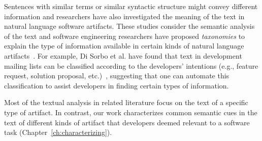 Sentences with similar terms or similar syntactic structure might convey different information
and researchers have also investigated the meaning of the text in natural language software artifacts. 
These studies consider the semantic analysis of the text and 
software engineering researchers have proposed \textit{taxonomies} to explain the type of information 
available in certain kinds of natural language artifacts~\cite{Maalej2013, Arya2019}. 
For example, Di Sorbo et al. have found that 
text in development mailing lists can be classified according to the developers' intentions (e.g., feature request, solution proposal, etc.)~\cite{Sorbo2015},
suggesting that one can automate this classification to assist developers in finding 
certain types of information.




Most of the textual analysis in related literature focus on the text of a specific 
type of artifact. In contrast, our work 
characterizes common semantic cues in the text 
of different kinds of artifact that developers 
deemed relevant to a software task (Chapter~\ref{ch:characterizing}).


























